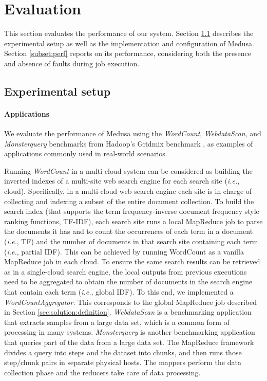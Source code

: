 \documentclass[10pt, conference, compsocconf]{IEEEtran}
\begin{document}
\section{Evaluation}
\label{sec:evaluation}

This section evaluates the performance of our system.
Section \ref{subset:setup} describes the experimental setup as well as the implementation and configuration of Medusa.
Section \ref{subset:perf} reports on its performance, considering both the presence and absence of faults during job execution.

\subsection{Experimental setup}
\label{subset:setup}

\paragraph{Applications} We evaluate the performance of Medusa using the \textit{WordCount}, \textit{WebdataScan}, and \textit{Monsterquery} benchmarks from Hadoop's Gridmix benchmark \cite{gridmix}, as examples of applications commonly used in real-world scenarios.

Running \textit{WordCount} in a multi-cloud system can be considered as building the inverted indexes of a multi-site web search engine for each search site (\textit{i.e.}, cloud).
Specifically, in a multi-cloud web search engine each site is in charge of collecting and indexing a subset of the entire document collection. To build the search index (that supports the term frequency-inverse document frequency style ranking functions, TF-IDF), each search site runs a local MapReduce job to parse the documents it has and to count the occurrences of each term in a document (\textit{i.e.}, TF) and the number of documents in that search site containing each term (\textit{i.e.}, partial IDF). This can be achieved by running WordCount as a vanilla MapReduce job in each cloud. To ensure the same search results can be retrieved as in a single-cloud search engine, the local outputs from previous executions need to be aggregated to obtain the number of documents in the search engine that contain each term (\textit{i.e.}, global IDF). To this end, we implemented a \textit{WordCountAggregator}. This corresponds to the global MapReduce job described in Section \ref{sec:solution:definition}.
\textit{WebdataScan} is a benchmarking application that extracts samples from a large data set, which is a common form of processing in many systems.
\textit{Monsterquery} is another benchmarking application that queries part of the data from a large data set.
The MapReduce framework divides a query into steps and the dataset into chunks, and then runs those step/chunk pairs in separate physical hosts.
The mappers  perform the data collection phase and the reducers take care of data processing.
\end{document}
